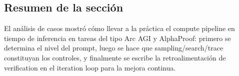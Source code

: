 \subsection{Resumen de la sección}
El análisis de casos mostró cómo llevar a la práctica el compute pipeline en tiempo de inferencia en tareas del tipo Arc AGI y AlphaProof: primero se determina el nivel del prompt, luego se hace que sampling/search/trace constituyan los controles, y finalmente se escribe la retroalimentación de verification en el iteration loop para la mejora continua.

